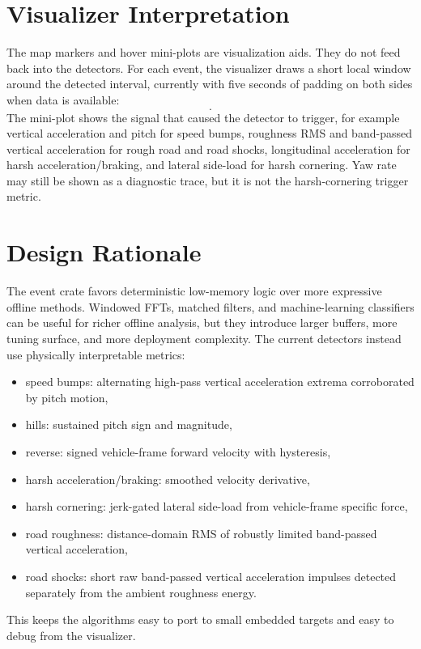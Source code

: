 \documentclass[11pt]{article}
\begin{document}
\section{Visualizer Interpretation}

The map markers and hover mini-plots are visualization aids. They do not feed
back into the detectors. For each event, the visualizer draws a short local
window around the detected interval, currently with five seconds of padding on
both sides when data is available:
\begin{equation}
  [t_{\mathrm{start}}-5,\;t_{\mathrm{end}}+5].
\end{equation}
The mini-plot shows the signal that caused the detector to trigger, for example
vertical acceleration and pitch for speed bumps, roughness RMS and band-passed
vertical acceleration for rough road and road shocks, longitudinal acceleration
for harsh acceleration/braking, and lateral side-load for harsh cornering. Yaw
rate may still be shown as a diagnostic trace, but it is not the
harsh-cornering trigger metric.

\section{Design Rationale}

The event crate favors deterministic low-memory logic over more expressive
offline methods. Windowed FFTs, matched filters, and machine-learning
classifiers can be useful for richer offline analysis, but they introduce
larger buffers, more tuning surface, and more deployment complexity. The current
detectors instead use physically interpretable metrics:
\begin{itemize}[nosep]
  \item speed bumps: alternating high-pass vertical acceleration extrema
    corroborated by pitch motion,
  \item hills: sustained pitch sign and magnitude,
  \item reverse: signed vehicle-frame forward velocity with hysteresis,
  \item harsh acceleration/braking: smoothed velocity derivative,
  \item harsh cornering: jerk-gated lateral side-load from vehicle-frame
    specific force,
  \item road roughness: distance-domain RMS of robustly limited band-passed
    vertical acceleration,
  \item road shocks: short raw band-passed vertical acceleration impulses
    detected separately from the ambient roughness energy.
\end{itemize}

This keeps the algorithms easy to port to small embedded targets and easy to
debug from the visualizer.
\end{document}
